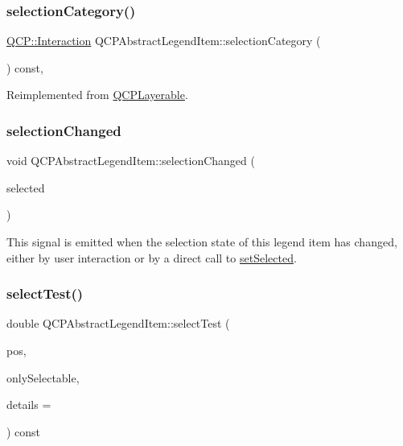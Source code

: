 \subsubsection{\texorpdfstring{selectionCategory()}{selectionCategory()}}
{\footnotesize\ttfamily \mbox{\hyperlink{namespace_q_c_p_a2ad6bb6281c7c2d593d4277b44c2b037}{Q\+C\+P\+::\+Interaction}} Q\+C\+P\+Abstract\+Legend\+Item\+::selection\+Category (\begin{DoxyParamCaption}{ }\end{DoxyParamCaption}) const\hspace{0.3cm}{\ttfamily [protected]}, {\ttfamily [virtual]}}



Reimplemented from \mbox{\hyperlink{class_q_c_p_layerable_a908c9edda761886f33893be326dab77d}{Q\+C\+P\+Layerable}}.

\mbox{\label{class_q_c_p_abstract_legend_item_a7cb61fdfbaf69c590bacb8f9e7099d9e}} 
\subsubsection{\texorpdfstring{selectionChanged}{selectionChanged}}
{\footnotesize\ttfamily void Q\+C\+P\+Abstract\+Legend\+Item\+::selection\+Changed (\begin{DoxyParamCaption}\item[{bool}]{selected }\end{DoxyParamCaption})\hspace{0.3cm}{\ttfamily [signal]}}

This signal is emitted when the selection state of this legend item has changed, either by user interaction or by a direct call to \mbox{\hyperlink{class_q_c_p_abstract_legend_item_a6eed93b0ab99cb3eabb043fb08179c2b}{set\+Selected}}. \mbox{\label{class_q_c_p_abstract_legend_item_a80ec112a6608fc39dbed56239849b187}} 
\subsubsection{\texorpdfstring{selectTest()}{selectTest()}}
{\footnotesize\ttfamily double Q\+C\+P\+Abstract\+Legend\+Item\+::select\+Test (\begin{DoxyParamCaption}\item[{const Q\+PointF \&}]{pos,  }\item[{bool}]{only\+Selectable,  }\item[{Q\+Variant $\ast$}]{details = {} }\end{DoxyParamCaption}) const\hspace{0.3cm}{\ttfamily [virtual]}}

